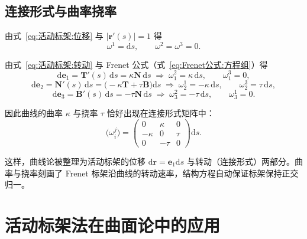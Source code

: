 \subsection{连接形式与曲率挠率}

由式~\eqref{eq:活动标架:位移} 与 $\left|\boldsymbol{r}'(s)\right|=1$ 得
\begin{equation}
	\omega^{1}=\mathrm{d}s,\qquad\omega^{2}=\omega^{3}=0.
	\label{eq:曲线:平移形式}
\end{equation}

由式~\eqref{eq:活动标架:转动} 与 Frenet 公式（式~\eqref{eq:Frenet公式:方程组}）得
\begin{equation}
	\mathrm{d}\mathbf{e}_1=\mathbf{T}'(s)\,\mathrm{d}s=\kappa\mathbf{N}\,\mathrm{d}s
	\;\Longrightarrow\;
	\omega_{1}^{2}=\kappa\,\mathrm{d}s,\qquad\omega_{1}^{3}=0,
	\label{eq:曲线:连接形式1}
\end{equation}
\begin{equation}
	\mathrm{d}\mathbf{e}_2=\mathbf{N}'(s)\,\mathrm{d}s=\bigl(-\kappa\mathbf{T}+\tau\mathbf{B}\bigr)\mathrm{d}s
	\;\Longrightarrow\;
	\omega_{2}^{1}=-\kappa\,\mathrm{d}s,\qquad\omega_{2}^{3}=\tau\,\mathrm{d}s,
	\label{eq:曲线:连接形式2}
\end{equation}
\begin{equation}
	\mathrm{d}\mathbf{e}_3=\mathbf{B}'(s)\,\mathrm{d}s=-\tau\mathbf{N}\,\mathrm{d}s
	\;\Longrightarrow\;
	\omega_{3}^{2}=-\tau\,\mathrm{d}s,\qquad\omega_{3}^{1}=0.
	\label{eq:曲线:连接形式3}
\end{equation}

因此曲线的曲率 $\kappa$ 与挠率 $\tau$ 恰好出现在连接形式矩阵中：
\begin{equation}
	\bigl(\omega_{i}^{j}\bigr)=
	\begin{pmatrix}
		0 & \kappa & 0\\
		-\kappa & 0 & \tau\\
		0 & -\tau & 0
	\end{pmatrix}\mathrm{d}s.
	\label{eq:曲线:连接形式矩阵}
\end{equation}

\begin{remark}
	这样，曲线论被整理为活动标架的位移 $\mathrm{d}\boldsymbol{r}=\mathbf{e}_1\mathrm{d}s$ 与转动（连接形式）两部分。曲率与挠率刻画了 Frenet 标架沿曲线的转动速率，结构方程自动保证标架保持正交归一。
\end{remark}

\section{活动标架法在曲面论中的应用}

